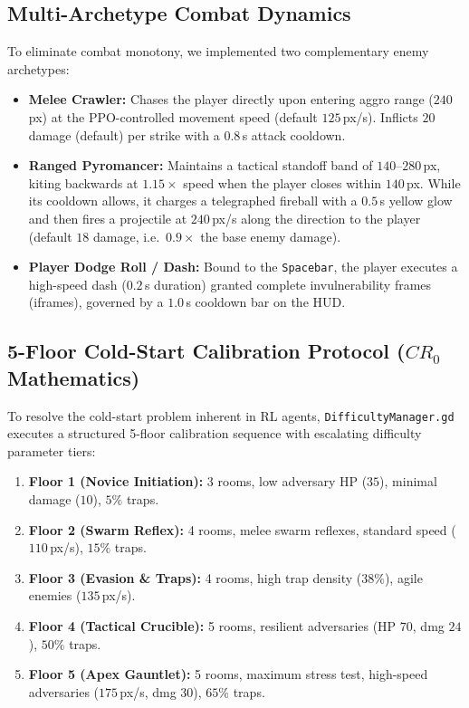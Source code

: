 \subsection{Multi-Archetype Combat Dynamics}
To eliminate combat monotony, we implemented two complementary enemy archetypes:
\begin{itemize}
    \item \textbf{Melee Crawler:} Chases the player directly upon entering aggro range ($240$\,px) at the PPO-controlled movement speed (default $125$\,px/s). Inflicts $20$ damage (default) per strike with a $0.8$\,s attack cooldown.
    \item \textbf{Ranged Pyromancer:} Maintains a tactical standoff band of $140$--$280$\,px, kiting backwards at $1.15\times$ speed when the player closes within $140$\,px. While its cooldown allows, it charges a telegraphed fireball with a $0.5$\,s yellow glow and then fires a projectile at $240$\,px/s along the direction to the player (default $18$ damage, i.e.\ $0.9\times$ the base enemy damage).
    \item \textbf{Player Dodge Roll / Dash:} Bound to the \texttt{Spacebar}, the player executes a high-speed dash ($0.2$\,s duration) granted complete invulnerability frames (iframes), governed by a $1.0$\,s cooldown bar on the HUD.
\end{itemize}

\subsection{5-Floor Cold-Start Calibration Protocol ($CR_0$ Mathematics)}
To resolve the cold-start problem inherent in RL agents, \texttt{DifficultyManager.gd} executes a structured 5-floor calibration sequence with escalating difficulty parameter tiers:
\begin{enumerate}
    \item \textbf{Floor 1 (Novice Initiation):} 3 rooms, low adversary HP ($35$), minimal damage ($10$), $5\%$ traps.
    \item \textbf{Floor 2 (Swarm Reflex):} 4 rooms, melee swarm reflexes, standard speed ($110$\,px/s), $15\%$ traps.
    \item \textbf{Floor 3 (Evasion \& Traps):} 4 rooms, high trap density ($38\%$), agile enemies ($135$\,px/s).
    \item \textbf{Floor 4 (Tactical Crucible):} 5 rooms, resilient adversaries (HP $70$, dmg $24$), $50\%$ traps.
    \item \textbf{Floor 5 (Apex Gauntlet):} 5 rooms, maximum stress test, high-speed adversaries ($175$\,px/s, dmg $30$), $65\%$ traps.
\end{enumerate}

